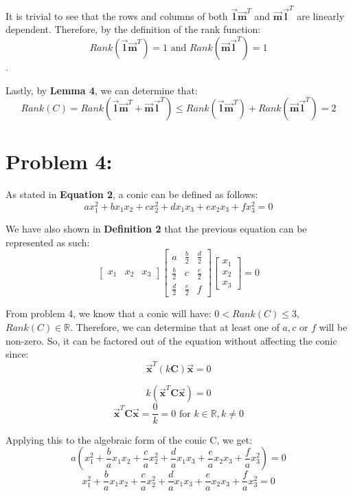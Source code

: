 \documentclass{article}
\begin{document}
It is trivial to see that the rows and columns of both \(\boldsymbol{\Vec{l}} \boldsymbol{\Vec{m}}^T\) and \(\boldsymbol{\Vec{m}} \boldsymbol{\Vec{l}}^T\) are linearly dependent. Therefore, by the definition of the rank function:
\[
Rank(\boldsymbol{\Vec{l}} \boldsymbol{\Vec{m}}^T) = 1 \text{ and } Rank(\boldsymbol{\Vec{m}} \boldsymbol{\Vec{l}}^T) = 1
\]. 

Lastly, by \textbf{Lemma 4}, we can determine that: 
\[Rank(C) = Rank(\boldsymbol{\Vec{l}} \boldsymbol{\Vec{m}}^T + \boldsymbol{\Vec{m}} \boldsymbol{\Vec{l}}^T) \leq Rank(\boldsymbol{\Vec{l}} \boldsymbol{\Vec{m}}^T) + Rank(\boldsymbol{\Vec{m}} \boldsymbol{\Vec{l}}^T) = 2
\]
\newpage
\section*{Problem 4:}
As stated in \textbf{Equation 2}, a conic can be defined as follows: \[ax_1^2 + bx_1x_2 + cx_2^2 + dx_1x_3 + ex_2x_3 + fx_3^2 = 0\]

We have also shown in \textbf{Definition 2} that the previous equation can be represented as such: 
\[\begin{bmatrix}
    x_1 & x_2 & x_3
\end{bmatrix} \begin{bmatrix}
    a & \frac{b}{2} & \frac{d}{2} \\
    \frac{b}{2} & c & \frac{e}{2} \\
    \frac{d}{2} & \frac{e}{2} & f
\end{bmatrix} \begin{bmatrix}
    x_1 \\ x_2 \\ x_3
\end{bmatrix} = 0
\]

From problem 4, we know that a conic will have: \(0 < Rank(C) \leq 3\), \(Rank(C) \in \mathbb{R}\). Therefore, we can determine that at least one of $a, c \text{ or } f$ will be non-zero. So, it can be factored out of the equation without affecting the conic since:
\[\boldsymbol{\Vec{x}}^T (k\boldsymbol{C}) \boldsymbol{\Vec{x}} = 0\]

\[k(\boldsymbol{\Vec{x}}^T \boldsymbol{C} \boldsymbol{\Vec{x}}) = 0\]
\[\boldsymbol{\Vec{x}}^T \boldsymbol{C} \boldsymbol{\Vec{x}} = \frac{0}{k} = 0 \text{ for } k\in\mathbb{R}, k\neq0\]

Applying this to the algebraic form of the conic C, we get:
\[a (x_1^2 + \frac{b}{a}x_1x_2 + \frac{c}{a}x_2^2 + \frac{d}{a}x_1x_3 + \frac{e}{a}x_2x_3 + \frac{f}{a}x_3^2) = 0\]
\[x_1^2 + \frac{b}{a}x_1x_2 + \frac{c}{a}x_2^2 + \frac{d}{a}x_1x_3 + \frac{e}{a}x_2x_3 + \frac{f}{a}x_3^2 = 0\]
\end{document}

